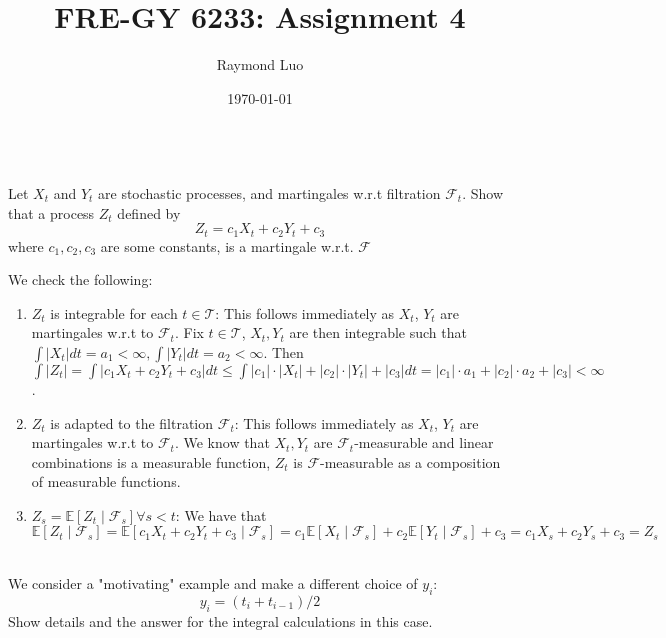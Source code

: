 \documentclass[12pt,twoside, letter]{exam}
\theoremstyle{definition}
\newcommand{\ee}{\mathbb{E}}
\begin{document}
\abovedisplayskip=12pt
\belowdisplayskip=12pt
\abovedisplayshortskip=7pt
\belowdisplayshortskip=10pt
\allowdisplaybreaks

\setlength{\parindent}{18pt}

\title{FRE-GY 6233: Assignment 4}
\author{Raymond Luo}
\date{\today}
\maketitle

\\
Let $X_t$ and $Y_t$ are stochastic processes, and martingales w.r.t filtration $\mathcal{F}_t$.
Show that a process $Z_t$ defined by
  \begin{equation*}
    Z_t = c_1X_t + c_2Y_t + c_3
  \end{equation*}
where $c_1, c_2, c_3$ are some constants, is a martingale w.r.t. $\mathcal{F}$

\begin{solution}
  We check the following:
  \begin{enumerate}[label =(\roman*)]
    \item $Z_t$ is integrable for each $t \in \mathcal{T}$: This follows immediately as $X_t$, $Y_t$ are martingales w.r.t to $\mathcal{F}_t$.
      Fix $t \in \mathcal{T}$, $X_t, Y_t$ are then integrable such that $\int |X_t| dt = a_1 < \infty, \int |Y_t| dt = a_2 < \infty$.
      Then $\int |Z_t| = \int |c_1X_t + c_2Y_t + c_3|dt \leq \int |c_1|\cdot|X_t| + |c_2|\cdot|Y_t| + |c_3| dt =  |c_1|\cdot a_1 + |c_2|
      \cdot a_2 + |c_3| < \infty$.
    \item $Z_t$ is adapted to the filtration $\mathcal{F}_t$: This follows immediately as $X_t$, $Y_t$ are martingales w.r.t to $\mathcal{F}_t$.
      We know that $X_t, Y_t$ are $\mathcal{F}_t$-measurable and linear combinations is a measurable function, $Z_t$ is $\mathcal{F}$-measurable as a composition
      of measurable functions.
    \item $Z_s = \ee[Z_t \mid \mathcal{F}_{s}] \forall s<t$: We have that $\ee[Z_t \mid \mathcal{F}_{s}] = \ee[c_1X_t + c_2Y_t + c_3 \mid \mathcal{F}_{s}]
      = c_1\ee[X_t \mid \mathcal{F}_{s}] + c_2\ee[Y_t \mid \mathcal{F}_{s}] + c_3
      = c_1X_s + c_2Y_s + c_3 = Z_s$
  \end{enumerate}
\end{solution}

\\
We consider a "motivating" example and make a different choice of $y_i$:
  \begin{equation*}
    y_{i} = (t_{i} + t_{i-1})/2
  \end{equation*}
Show details and the answer for the integral calculations in this case.
\end{document}
